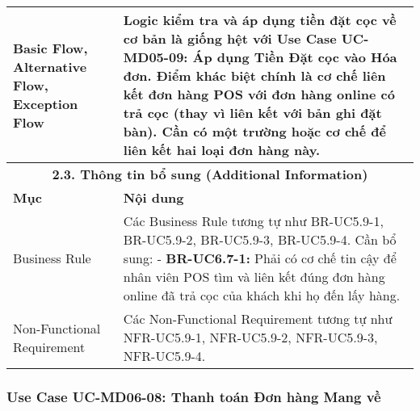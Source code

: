 \begin{longtable}{|m{4cm}|p{11cm}|}
Basic Flow, Alternative Flow, Exception Flow & Logic kiểm tra và áp dụng tiền đặt cọc về cơ bản là giống hệt với Use Case UC-MD05-09: Áp dụng Tiền Đặt cọc vào Hóa đơn. Điểm khác biệt chính là cơ chế liên kết đơn hàng POS với đơn hàng online có trả cọc (thay vì liên kết với bản ghi đặt bàn). Cần có một trường hoặc cơ chế để liên kết hai loại đơn hàng này. \\
\hline
\multicolumn{2}{|c|}{\textbf{2.3. Thông tin bổ sung (Additional Information)}} \\
\hline
\textbf{Mục} & \textbf{Nội dung} \\
\hline
Business Rule & Các Business Rule tương tự như BR-UC5.9-1, BR-UC5.9-2, BR-UC5.9-3, BR-UC5.9-4. Cần bổ sung: \newline - \textbf{BR-UC6.7-1:} Phải có cơ chế tin cậy để nhân viên POS tìm và liên kết đúng đơn hàng online đã trả cọc của khách khi họ đến lấy hàng. \\
\hline
Non-Functional Requirement & Các Non-Functional Requirement tương tự như NFR-UC5.9-1, NFR-UC5.9-2, NFR-UC5.9-3, NFR-UC5.9-4. \\
\hline
\end{longtable}

\subsubsection{Use Case UC-MD06-08: Thanh toán Đơn hàng Mang về}

